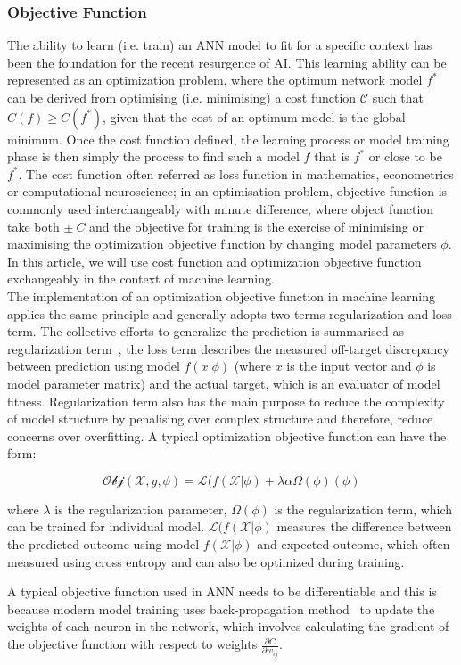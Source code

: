 \subsubsection{Objective Function}
The ability to learn (i.e. train) an ANN model to fit for a specific context has been the foundation for the recent resurgence of AI. This learning ability can be represented as an optimization problem, where the optimum network model $f^*$ can be derived from optimising (i.e. minimising) a cost function $\mathcal{C}$ such that $C(f) \geq C(f^*)$, given that the cost of an optimum model is the global minimum. Once the cost function defined, the learning process or model training phase is then simply the process to find such a model $f$ that is $f^*$ or close to be $f^*$. The cost function often referred as loss function in mathematics, econometrics or computational neuroscience; in an optimisation problem, objective function is commonly used interchangeably with minute difference, where object function take both $\pm~C$ and the objective for training is the exercise of minimising or maximising the optimization objective function by changing model parameters $\phi$. In this article, we will use cost function and optimization objective function exchangeably in the context of machine learning.
\\
The implementation of an optimization objective function in machine learning applies the same principle and generally adopts two terms regularization and loss term. The collective efforts to generalize the prediction is summarised as regularization term~\cite{goodfellow_2015}, the loss term describes the measured off-target discrepancy between prediction using model $f(x|\phi)$ (where $x$ is the input vector and $\phi$ is model parameter matrix) and the actual target, which is an evaluator of model fitness. Regularization term also has the main purpose to reduce the complexity of model structure by penalising over complex structure and therefore, reduce concerns over overfitting. A typical optimization objective function can have the form:

\begin{equation}
    \mathcal{Obj}(\mathcal{X},y,\phi) = \mathcal{L}(f(\mathcal{X}|\phi) + \lambda \alpha\Omega(\phi) (\phi) 
\end{equation}

where $\lambda$ is the regularization parameter, $\Omega(\phi)$ is the regularization term, which can be trained for individual model. $\mathcal{L}(f(\mathcal{X}|\phi)$ measures the difference between the predicted outcome using model $f(\mathcal{X}|\phi)$ and expected outcome, which often measured using cross entropy and can also be optimized during training. 
\par 
A typical objective function used in ANN needs to be differentiable and this is because modern model training uses back-propagation method~\cite{LeCun_2015,Heaton_2017} to update the weights of each neuron in the network, which involves calculating the gradient of the objective function with respect to weights $\frac {\partial{C}} {\partial{w_{ij}}} $.